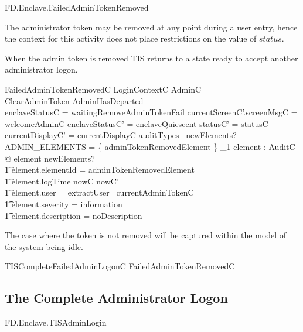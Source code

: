 \begin{traceunit}{FD.Enclave.FailedAdminTokenRemoved}
\end{traceunit}


The administrator token may be removed at any point during a user
entry, hence the context for this
activity does not place restrictions on the value of $status$.

When the admin token is removed TIS returns to a state ready
to accept another administrator logon.

\begin{schema}{FailedAdminTokenRemovedC}
        LoginContextC
\also
        \Xi AdminC
\\      ClearAdminToken
\where
        AdminHasDeparted
\\      enclaveStatusC = waitingRemoveAdminTokenFail
\also
        currentScreenC'.screenMsgC = welcomeAdminC
\also
        enclaveStatusC' = enclaveQuiescent
\also
        statusC' = statusC
\\      currentDisplayC' = currentDisplayC
\also
        auditTypes~ newElements? \cap ADMIN\_ELEMENTS = 
        \{ adminTokenRemovedElement \} 
\also
        \exists_1 element : AuditC @ element \in newElements? 
\\ \t1  \land element.elementId = adminTokenRemovedElement
\\ \t1  \land element.logTime \in nowC \upto nowC'
\\ \t1  \land element.user = extractUser~ currentAdminTokenC
\\ \t1  \land element.severity = information
\\ \t1  \land element.description = noDescription
\end{schema}

The case where the token is not removed will be captured within the
model of the system being idle.

\begin{zed}
        TISCompleteFailedAdminLogonC  FailedAdminTokenRemovedC 

\end{zed}

\subsection{The Complete Administrator Logon}

\begin{traceunit}{FD.Enclave.TISAdminLogin}
\end{traceunit}

